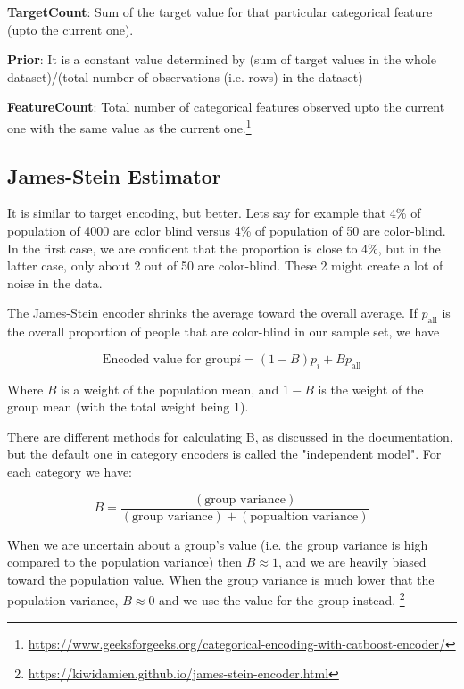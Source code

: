 \documentclass{article}
\begin{document}
\noindent \textbf{TargetCount}:  Sum of the target value for that particular categorical feature (upto the current one).

\noindent \textbf{Prior}: It is a constant value determined by (sum of target values in the whole dataset)/(total number of observations (i.e. rows) in the dataset)

\noindent \textbf{FeatureCount}: Total number of categorical features observed upto the current one with the same value as the current one.\footnote{\url{https://www.geeksforgeeks.org/categorical-encoding-with-catboost-encoder/}}

\subsection*{James-Stein Estimator}
It is similar to target encoding, but better. Lets say for example that 4\% of population of 4000 are color blind versus 4\% of population of 50 are color-blind. In the first case, we are confident that the proportion is close to 4\%, but in the latter case, only about 2 out of 50 are color-blind. These 2 might create a lot of noise in the data.

\noindent The James-Stein encoder shrinks the average toward the overall average. If $p_{\text{all}} $ is the overall proportion of people that are color-blind in our sample set, we have

\begin{equation}
\text{Encoded value for group}  i = (1 - B)p_i + Bp_{\text{all}} 
\end{equation}

\noindent Where $B$ is a weight of the population mean, and $1-B$ is the weight of the group mean (with the total weight being 1).

\noindent There are different methods for calculating B, as discussed in the documentation, but the default one in category encoders is called the "independent model". For each category we have:

\begin{equation}
B = \frac{(\text{group variance})}{(\text{group variance}) + (\text{popualtion variance})}
\end{equation}


\noindent When we are uncertain about a group's value (i.e. the group variance is high compared to the population variance) then $B \approx 1$, and we are heavily biased toward the population value. When the group variance is much lower that the population variance, $B \approx 0$ and we use the value for the group instead. \footnote{\url{https://kiwidamien.github.io/james-stein-encoder.html}}
\end{document}
